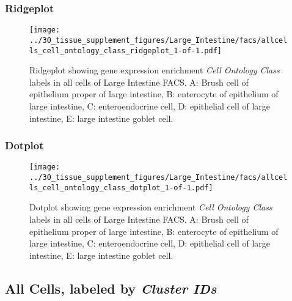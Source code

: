 \clearpage

\subsubsection{Ridgeplot}
\begin{figure}[h]
\centering
\texttt{[image: ../30\_tissue\_supplement\_figures/Large\_Intestine/facs/allcells\_cell\_ontology\_class\_ridgeplot\_1-of-1.pdf]}

\caption{ Ridgeplot  showing gene expression enrichment \emph{Cell Ontology Class} labels in all cells of Large Intestine FACS. A: Brush cell of epithelium proper of large intestine, B: enterocyte of epithelium of large intestine, C: enteroendocrine cell, D: epithelial cell of large intestine, E: large intestine goblet cell.}
\end{figure}


\clearpage

\subsubsection{Dotplot}
\begin{figure}[h]
\centering
\texttt{[image: ../30\_tissue\_supplement\_figures/Large\_Intestine/facs/allcells\_cell\_ontology\_class\_dotplot\_1-of-1.pdf]}

\caption{ Dotplot  showing gene expression enrichment \emph{Cell Ontology Class} labels in all cells of Large Intestine FACS. A: Brush cell of epithelium proper of large intestine, B: enterocyte of epithelium of large intestine, C: enteroendocrine cell, D: epithelial cell of large intestine, E: large intestine goblet cell.}
\end{figure}


\clearpage

\subsection{All Cells, labeled by \emph{Cluster IDs}}
